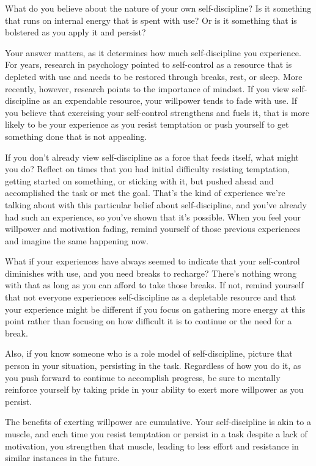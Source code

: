 \documentclass[UTF8,11pt]{ctexart}
\begin{document}
What do you believe about the nature of your own self-discipline? Is it something that runs on internal energy that is spent with use? Or is it something that is bolstered as you apply it and persist?


Your answer matters, as it determines how much self-discipline you experience. For years, research in psychology pointed to self-control as a resource that is depleted with use and needs to be restored through breaks, rest, or sleep. More recently, however, research points to the importance of mindset. If you view self-discipline as an expendable resource, your willpower tends to fade with use. If you believe that exercising your self-control strengthens and fuels it, that is more likely to be your experience as you resist temptation or push yourself to get something done that is not appealing.


If you don’t already view self-discipline as a force that feeds itself, what might you do? Reflect on times that you had initial difficulty resisting temptation, getting started on something, or sticking with it, but pushed ahead and accomplished the task or met the goal. That’s the kind of experience we’re talking about with this particular belief about self-discipline, and you’ve already had such an experience, so you’ve shown that it’s possible. When you feel your willpower and motivation fading, remind yourself of those previous experiences and imagine the same happening now.


What if your experiences have always seemed to indicate that your self-control diminishes with use, and you need breaks to recharge? There’s nothing wrong with that as long as you can afford to take those breaks. If not, remind yourself that not everyone experiences self-discipline as a depletable resource and that your experience might be different if you focus on gathering more energy at this point rather than focusing on how difficult it is to continue or the need for a break.


Also, if you know someone who is a role model of self-discipline, picture that person in your situation, persisting in the task. Regardless of how you do it, as you push forward to continue to accomplish progress, be sure to mentally reinforce yourself by taking pride in your ability to exert more willpower as you persist.


The benefits of exerting willpower are cumulative. Your self-discipline is akin to a muscle, and each time you resist temptation or persist in a task despite a lack of motivation, you strengthen that muscle, leading to less effort and resistance in similar instances in the future.
\end{document}
